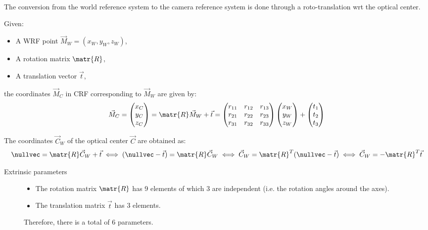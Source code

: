 The conversion from the world reference system to the camera reference system
is done through a roto-translation wrt the optical center.

Given: 
\begin{itemize}
    \item A WRF point $\vec{M}_W = (x_W, y_W, z_W)$,
    \item A rotation matrix $\matr{R}$,
    \item A translation vector $\vec{t}$,
\end{itemize}
the coordinates $\vec{M}_C$ in CRF corresponding to $\vec{M}_W$ are given by:
\[  
    \vec{M}_C = \begin{pmatrix} x_C \\ y_C \\ z_C \end{pmatrix} =
    \matr{R}\vec{M}_W + \vec{t} =
    \begin{pmatrix}
        r_{11} & r_{12} & r_{13} \\
        r_{21} & r_{22} & r_{23} \\
        r_{31} & r_{32} & r_{33} \\
    \end{pmatrix}
    \begin{pmatrix}
        x_W \\ y_W \\ z_W
    \end{pmatrix}
    +
    \begin{pmatrix}
        t_1 \\ t_2 \\ t_3
    \end{pmatrix}
\]

\begin{remark}
    The coordinates $\vec{C}_W$ of the optical center $\vec{C}$ are obtained as:
    \[ 
        \nullvec = \matr{R}\vec{C}_W + \vec{t} 
            \iff (\nullvec - \vec{t}) = \matr{R}\vec{C}_W 
            \iff \vec{C}_W = \matr{R}^T (\nullvec - \vec{t})
            \iff \vec{C}_W = -\matr{R}^T\vec{t}
    \]
\end{remark}

\begin{description}
    \item[Extrinsic parameters] 
        \phantom{}
        \begin{itemize}
            \item The rotation matrix $\matr{R}$ has 9 elements of which 3 are independent (i.e. the rotation angles around the axes). 
            \item The translation matrix $\vec{t}$ has 3 elements.
        \end{itemize}

        Therefore, there is a total of 6 parameters.
\end{description}


